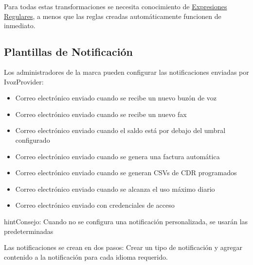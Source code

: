 \documentclass[letterpaper,10pt,spanish]{sphinxmanual}
\begin{document}
Para todas estas transformaciones se necesita conocimiento de \href{http://php.net/manual/en/reference.pcre.pattern.syntax.php}{Expresiones Regulares}, a menos que las reglas creadas automáticamente funcionen de inmediato.
\label{administration_portal/brand/settings/notification_templates:notification-templates}

\subsection{Plantillas de Notificación}
\label{administration_portal/brand/settings/notification_templates:id2}\label{administration_portal/brand/settings/notification_templates::doc}\label{administration_portal/brand/settings/notification_templates:notification-templates}\label{administration_portal/brand/settings/notification_templates:id1}
Los administradores de la marca pueden configurar las notificaciones enviadas por IvozProvider:
\begin{itemize}
\item {} 
Correo electrónico enviado cuando se recibe un nuevo buzón de voz

\item {} 
Correo electrónico enviado cuando se recibe un nuevo fax

\item {} 
Correo electrónico enviado cuando el saldo está por debajo del umbral configurado

\item {} 
Correo electrónico enviado cuando se genera una factura automática

\item {} 
Correo electrónico enviado cuando se generan CSVs de CDR programados

\item {} 
Correo electrónico enviado cuando se alcanza el uso máximo diario

\item {} 
Correo electrónico enviado con credenciales de acceso

\end{itemize}

\begin{notice}{hint}{Consejo:}
Cuando no se configura una notificación personalizada, se usarán las predeterminadas
\end{notice}

Las notificaciones se crean en dos pasos: Crear un tipo de notificación y agregar contenido a la notificación para cada idioma requerido.
\end{document}
